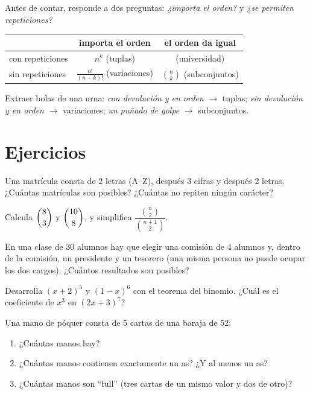 \begin{method}\label{met:g12:comb:model}
Antes de contar, responde a dos preguntas: \emph{¿importa el orden?} y
\emph{¿se permiten repeticiones?}
\begin{center}
\begin{tabular}{l|cc}
 & importa el orden & el orden da igual\\
\hline
con repeticiones & $n^k$ (tuplas) & (universidad)\\
sin repeticiones & $\frac{n!}{(n-k)!}$ (variaciones) & $\binom nk$ (subconjuntos)
\end{tabular}
\end{center}
Extraer bolas de una urna: \emph{con devolución y en orden} $\to$ tuplas;
\emph{sin devolución y en orden} $\to$ variaciones; \emph{un puñado de golpe}
$\to$ subconjuntos.
\end{method}

\section{Ejercicios}

\begin{exercise}[$\star$]\label{exo:g12:comb:1}
Una matrícula consta de 2 letras (A--Z), después 3 cifras y después 2
letras. ¿Cuántas matrículas son posibles? ¿Cuántas no repiten ningún
carácter?
\end{exercise}

\begin{exercise}[$\star$]\label{exo:g12:comb:2}
Calcula $\dbinom{8}{3}$ y $\dbinom{10}{8}$, y simplifica
$\dfrac{\binom{n}{2}}{\binom{n+1}{2}}$.
\end{exercise}

\begin{exercise}[$\star$]\label{exo:g12:comb:3}
En una clase de 30 alumnos hay que elegir una comisión de 4 alumnos y,
dentro de la comisión, un presidente y un tesorero (una misma persona no
puede ocupar los dos cargos). ¿Cuántos resultados son posibles?
\end{exercise}

\begin{exercise}[$\star$]\label{exo:g12:comb:4}
Desarrolla $(x + 2)^5$ y $(1 - x)^6$ con el teorema del binomio. ¿Cuál es el
coeficiente de $x^3$ en $(2x + 3)^7$?
\end{exercise}

\begin{exercise}[$\star\star$]\label{exo:g12:comb:5}
Una mano de póquer consta de 5 cartas de una baraja de 52.
\begin{enumerate}
  \item ¿Cuántas manos hay?
  \item ¿Cuántas manos contienen exactamente un as? ¿Y al menos un as?
  \item ¿Cuántas manos son ``full'' (tres cartas de un mismo valor y dos de
        otro)?
\end{enumerate}
\end{exercise}

